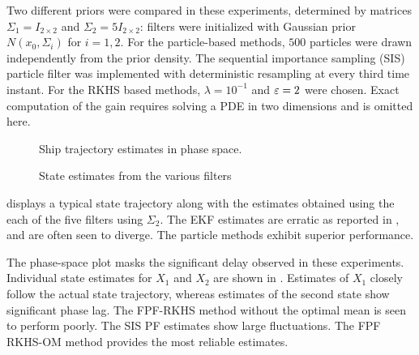 Two different priors were compared in these experiments, determined by matrices $\Sigma_1 = I_{2\times 2}$ and $ \Sigma_2 = 5 I_{2\times2}$:   filters were initialized with Gaussian prior $N(x_0, \Sigma_i)$ for $i=1,2$. For the particle-based methods, $500$ particles were drawn independently from the prior density. The sequential importance sampling (SIS) particle filter was implemented with deterministic resampling at every third time instant.  For the RKHS based methods, $\lambda = 10^{-1}$ and $\varepsilon = 2$ were chosen. Exact computation of the gain requires solving a PDE in two dimensions and is omitted here.

\begin{figure}
	
	\caption{Ship trajectory estimates in phase space.}
	\label{ship_state_estimate}
\end{figure}




\begin{figure}[h]
	
	\label{fig:ship_state_time_estimate}
	\caption{ State estimates  from the various filters}
	\label{fig:ship_state_estimate}
\end{figure}

 displays a typical state trajectory along with the estimates obtained using the each of the five filters using  $\Sigma_2$. The EKF estimates are erratic as reported in \cite{budchelee07}, and are often seen to diverge. The particle methods exhibit superior performance.

The phase-space plot masks the significant delay observed in these experiments.   Individual state estimates for $X_{1}$ and $X_2$ are shown in 	.
Estimates of $X_1$ closely follow the actual state trajectory, whereas estimates of the second state  show  significant phase lag. The FPF-RKHS method without the optimal mean is seen to perform poorly. The SIS PF estimates show large fluctuations.
The FPF RKHS-OM method provides the most reliable estimates.

